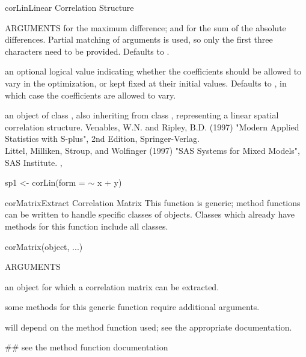 \documentclass[pdftex]{article} \usepackage{url,graphicx}
\renewcommand{\Twiddle}{\mbox{\(\sim\)}}
\begin{document}
\begin{Helpfile}{corLin}{Linear Correlation Structure}
\begin{Argument}{ARGUMENTS}
 for the maximum difference; and 
for the sum of the absolute differences. Partial matching of
arguments is used, so only the first three characters need to be
provided. Defaults to .
\item[\Co{fixed:}]
an optional logical value indicating whether the
coefficients should be allowed to vary in the optimization, or kept
fixed at their initial values. Defaults to , in which case
the coefficients are allowed to vary.
\end{Argument}
an object of class , also inheriting from class
, representing a linear spatial correlation
structure.
Venables, W.N. and Ripley, B.D. (1997) "Modern Applied Statistics with
S-plus", 2nd Edition, Springer-Verlag.\\
Littel, Milliken, Stroup, and Wolfinger (1997) "SAS Systems for Mixed
Models", SAS Institute.
, 
\need 15pt
\vspace{-16pt}
\begin{Example}
sp1 <- corLin(form = {\Twiddle} x + y)
\end{Example}
\end{Helpfile}
\begin{Helpfile}{corMatrix}{Extract Correlation Matrix}
This function is generic; method functions can be written to handle
specific classes of objects. Classes which already have methods for
this function include all  classes.
\begin{Example}
corMatrix(object, ...)
\end{Example}
\begin{Argument}{ARGUMENTS}
\item[\Co{object:}]
an object for which a correlation matrix can be
extracted.
\item[\Co{...:}]
some methods for this generic function require additional
arguments.
\end{Argument}
will depend on the method function used; see the appropriate
documentation.
\need 15pt
\vspace{-16pt} 
\begin{Example}
## see the method function documentation
\end{Example}
\end{Helpfile}
\end{document}
